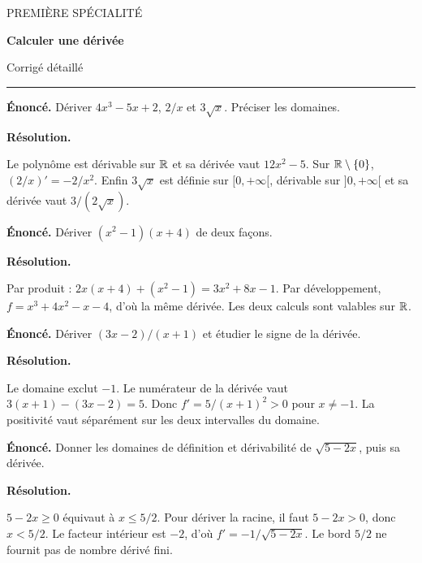 \documentclass[11pt,a4paper]{article}
\begin{document}
{\small\color{Blue}PREMIÈRE SPÉCIALITÉ}\par{\LARGE\bfseries Calculer une dérivée}\par{\large Corrigé détaillé}\par\vspace{0.2cm}\hrule\vspace{0.4cm}
\par\noindent\begin{minipage}{\linewidth}
{\small\color{Muted}\textbf{Énoncé.} Dériver $4x^3-5x+2$, $2/x$ et $3\sqrt{x}$. Préciser les domaines.}
\par\medskip
\textbf{Résolution.}\par
Le polynôme est dérivable sur $\mathbb{R}$ et sa dérivée vaut $12x^2-5$. Sur $\mathbb{R}\setminus\{0\}$, $(2/x)\prime=-2/x^2$. Enfin $3\sqrt{x}$ est définie sur $[0,+\infty[$, dérivable sur $]0,+\infty[$ et sa dérivée vaut $3/(2\sqrt{x})$.
\end{minipage}\par
\par\noindent\begin{minipage}{\linewidth}
{\small\color{Muted}\textbf{Énoncé.} Dériver $(x^2-1)(x+4)$ de deux façons.}
\par\medskip
\textbf{Résolution.}\par
Par produit : $2x(x+4)+(x^2-1)=3x^2+8x-1$. Par développement, $f=x^3+4x^2-x-4$, d’où la même dérivée. Les deux calculs sont valables sur $\mathbb{R}$.
\end{minipage}\par
\par\noindent\begin{minipage}{\linewidth}
{\small\color{Muted}\textbf{Énoncé.} Dériver $(3x-2)/(x+1)$ et étudier le signe de la dérivée.}
\par\medskip
\textbf{Résolution.}\par
Le domaine exclut $-1$. Le numérateur de la dérivée vaut $3(x+1)-(3x-2)=5$. Donc $f\prime=5/(x+1)^2>0$ pour $x\ne-1$. La positivité vaut séparément sur les deux intervalles du domaine.
\end{minipage}\par
\par\noindent\begin{minipage}{\linewidth}
{\small\color{Muted}\textbf{Énoncé.} Donner les domaines de définition et dérivabilité de $\sqrt{5-2x}$, puis sa dérivée.}
\par\medskip
\textbf{Résolution.}\par
$5-2x\ge0$ équivaut à $x\le5/2$. Pour dériver la racine, il faut $5-2x>0$, donc $x<5/2$. Le facteur intérieur est $-2$, d’où $f\prime=-1/\sqrt{5-2x}$. Le bord $5/2$ ne fournit pas de nombre dérivé fini.
\end{minipage}\par
\end{document}
